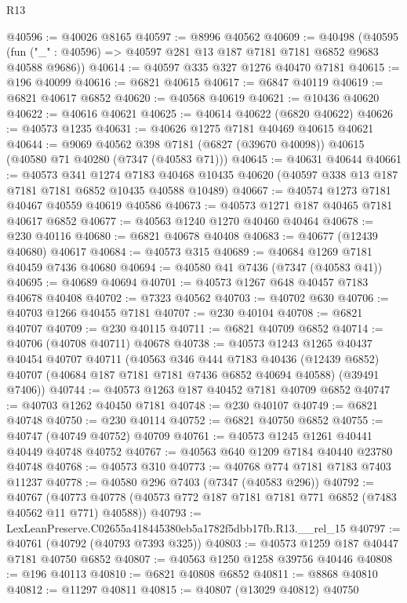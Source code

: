 \begin{lexlean}{R13}
\begin{coremodule}
@40596 := @40026 @8165
@40597 := @8996 @40562
@40609 := @40498
    (@40595 (fun ("_" : @40596) => @40597 @281 @13 @187 @7181 @7181 @6852 @9683 @40588 @9686))
@40614 := @40597 @335 @327 @1276 @40470 @7181
@40615 := @196 @40099
@40616 := @6821 @40615
@40617 := @6847 @40119
@40619 := @6821 @40617 @6852
@40620 := @40568 @40619
@40621 := @10436 @40620
@40622 := @40616 @40621
@40625 := @40614 @40622 (@6820 @40622)
@40626 := @40573 @1235
@40631 := @40626 @1275 @7181 @40469 @40615 @40621
@40644 := @9069
    @40562
    @398
    @7181
    (@6827 (@39670 @40098))
    @40615
    (@40580 @71 @40280 (@7347 (@40583 @71)))
@40645 := @40631 @40644
@40661 := @40573
    @341
    @1274
    @7183
    @40468
    @10435
    @40620
    (@40597 @338 @13 @187 @7181 @7181 @6852 @10435 @40588 @10489)
@40667 := @40574 @1273 @7181 @40467 @40559 @40619 @40586
@40673 := @40573 @1271 @187 @40465 @7181 @40617 @6852
@40677 := @40563 @1240 @1270 @40460 @40464
@40678 := @230 @40116
@40680 := @6821 @40678 @40408
@40683 := @40677 (@12439 @40680) @40617
@40684 := @40573 @315
@40689 := @40684 @1269 @7181 @40459 @7436 @40680
@40694 := @40580 @41 @7436 (@7347 (@40583 @41))
@40695 := @40689 @40694
@40701 := @40573 @1267 @648 @40457 @7183 @40678 @40408
@40702 := @7323 @40562
@40703 := @40702 @630
@40706 := @40703 @1266 @40455 @7181
@40707 := @230 @40104
@40708 := @6821 @40707
@40709 := @230 @40115
@40711 := @6821 @40709 @6852
@40714 := @40706 (@40708 @40711) @40678
@40738 := @40573
    @1243
    @1265
    @40437
    @40454
    @40707
    @40711
    (@40563
      @346
      @444
      @7183
      @40436
      (@12439 @6852)
      @40707
      (@40684 @187 @7181 @7181 @7436 @6852 @40694 @40588)
      (@39491 @7406))
@40744 := @40573 @1263 @187 @40452 @7181 @40709 @6852
@40747 := @40703 @1262 @40450 @7181
@40748 := @230 @40107
@40749 := @6821 @40748
@40750 := @230 @40114
@40752 := @6821 @40750 @6852
@40755 := @40747 (@40749 @40752) @40709
@40761 := @40573 @1245 @1261 @40441 @40449 @40748 @40752
@40767 := @40563 @640 @1209 @7184 @40440 @23780 @40748
@40768 := @40573 @310
@40773 := @40768 @774 @7181 @7183 @7403 @11237
@40778 := @40580 @296 @7403 (@7347 (@40583 @296))
@40792 := @40767
    (@40773 @40778 (@40573 @772 @187 @7181 @7181 @771 @6852 (@7483 @40562 @11 @771) @40588))
@40793 := LexLeanPreserve.C02655a418445380eb5a1782f5dbb17fb.R13.__rel_15
@40797 := @40761 (@40792 (@40793 @7393 @325))
@40803 := @40573 @1259 @187 @40447 @7181 @40750 @6852
@40807 := @40563 @1250 @1258 @39756 @40446
@40808 := @196 @40113
@40810 := @6821 @40808 @6852
@40811 := @8868 @40810
@40812 := @11297 @40811
@40815 := @40807 (@13029 @40812) @40750

\end{coremodule}
\end{lexlean}

